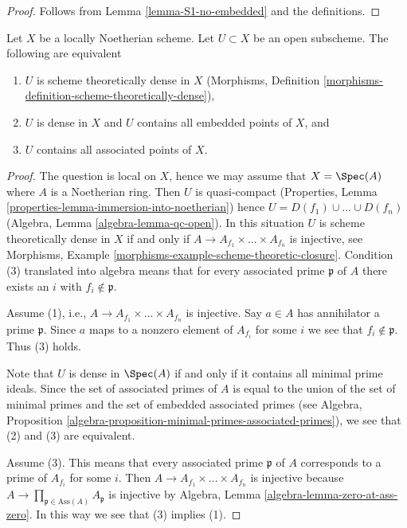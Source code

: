 \begin{proof}
Follows from Lemma \ref{lemma-S1-no-embedded} and the definitions.
\end{proof}

\begin{lemma}
\label{lemma-scheme-theoretically-dense-contain-embedded-points}
Let $X$ be a locally Noetherian scheme. Let $U \subset X$ be an
open subscheme. The following are equivalent
\begin{enumerate}
\item $U$ is scheme theoretically dense in $X$
(Morphisms, Definition \ref{morphisms-definition-scheme-theoretically-dense}),
\item $U$ is dense in $X$ and $U$ contains all embedded points of $X$, and
\item $U$ contains all associated points of $X$.
\end{enumerate}
\end{lemma}

\begin{proof}
The question is local on $X$, hence we may assume that $X = \Spec(A)$
where $A$ is a Noetherian ring. Then $U$ is quasi-compact
(Properties, Lemma \ref{properties-lemma-immersion-into-noetherian})
hence $U = D(f_1) \cup \ldots \cup D(f_n)$
(Algebra, Lemma \ref{algebra-lemma-qc-open}).
In this situation $U$ is scheme theoretically dense in $X$ if and only if
$A \to A_{f_1} \times \ldots \times A_{f_n}$ is injective, see
Morphisms, Example \ref{morphisms-example-scheme-theoretic-closure}.
Condition (3) translated into algebra means that for every associated
prime $\mathfrak p$ of $A$ there exists an $i$ with $f_i \not \in \mathfrak p$.

\medskip\noindent
Assume (1), i.e., $A \to A_{f_1} \times \ldots \times A_{f_n}$ is injective.
Say $a \in A$ has annihilator a prime $\mathfrak p$. Since $a$ maps
to a nonzero element of $A_{f_i}$ for some $i$ we see that
$f_i \not \in \mathfrak p$. Thus (3) holds.

\medskip\noindent
Note that $U$ is dense in $\Spec(A)$ if and only if it contains all
minimal prime ideals. Since the set of associated primes
of $A$ is equal to the union of the set of minimal primes and the
set of embedded associated primes (see Algebra, Proposition
\ref{algebra-proposition-minimal-primes-associated-primes}),
we see that (2) and (3) are equivalent.

\medskip\noindent
Assume (3). This means that every associated prime $\mathfrak p$ of $A$
corresponds to a prime of $A_{f_i}$ for some $i$. Then
$A \to A_{f_1} \times \ldots \times A_{f_n}$ is injective because
$A \to \prod_{\mathfrak p \in \text{Ass}(A)} A_\mathfrak p$ is injective
by Algebra, Lemma \ref{algebra-lemma-zero-at-ass-zero}. In this way
we see that (3) implies (1).
\end{proof}

